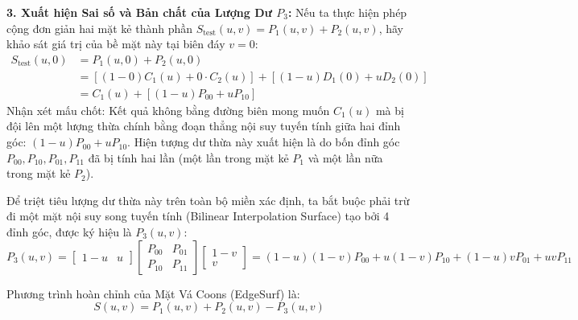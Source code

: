 \textbf{3. Xuất hiện Sai số và Bản chất của Lượng Dư $P_3$:}
Nếu ta thực hiện phép cộng đơn giản hai mặt kẻ thành phần $S_{\text{test}}(u, v) = P_1(u, v) + P_2(u, v)$, hãy khảo sát giá trị của bề mặt này tại biên đáy $v = 0$:
\begin{align}
S_{\text{test}}(u, 0) &= P_1(u, 0) + P_2(u, 0) \nonumber \\
&= \left[ (1 - 0) C_1(u) + 0 \cdot C_2(u) \right] + \left[ (1 - u) D_1(0) + u D_2(0) \right] \nonumber \\
&= C_1(u) + \left[ (1 - u) P_{00} + u P_{10} \right]
\end{align}
Nhận xét mấu chốt: Kết quả không bằng đường biên mong muốn $C_1(u)$ mà bị đội lên một lượng thừa chính bằng đoạn thẳng nội suy tuyến tính giữa hai đỉnh góc: $(1 - u) P_{00} + u P_{10}$.
Hiện tượng dư thừa này xuất hiện là do bốn đỉnh góc $P_{00}, P_{10}, P_{01}, P_{11}$ đã bị tính hai lần (một lần trong mặt kẻ $P_1$ và một lần nữa trong mặt kẻ $P_2$).

Để triệt tiêu lượng dư thừa này trên toàn bộ miền xác định, ta bắt buộc phải trừ đi một mặt nội suy song tuyến tính (Bilinear Interpolation Surface) tạo bởi 4 đỉnh góc, được ký hiệu là $P_3(u, v)$:
\begin{equation}
\label{eq:coons_p3}
P_3(u, v) = \begin{bmatrix} 1 - u & u \end{bmatrix} \begin{bmatrix} P_{00} & P_{01} \\ P_{10} & P_{11} \end{bmatrix} \begin{bmatrix} 1 - v \\ v \end{bmatrix} = (1 - u)(1 - v) P_{00} + u(1 - v) P_{10} + (1 - u) v P_{01} + u v P_{11}
\end{equation}

Phương trình hoàn chỉnh của Mặt Vá Coons (EdgeSurf) là:
\begin{equation}
\label{eq:coons_final}
S(u, v) = P_1(u, v) + P_2(u, v) - P_3(u, v)
\end{equation}

